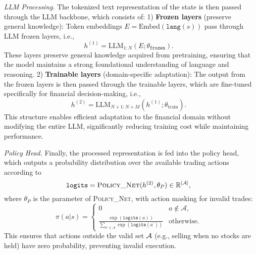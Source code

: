 \emph{LLM Processing.} The tokenized text representation of the state is then passed through the LLM backbone, which consists of:
1) \textbf{Frozen layers} (preserve general knowledge):
Token embeddings $E = \text{Embed}(\texttt{lang}(s))$ pass through LLM frozen layers, i.e.,
\begin{equation}
h^{(1)} = \text{LLM}_{1:N}(E;\theta_{\texttt{frozen}}).
\end{equation}
These layers preserve general knowledge acquired from pretraining, ensuring that the model maintains a strong foundational understanding of language and reasoning.
2) \textbf{Trainable layers} (domain-specific adaptation): The output from the frozen layers is then passed through the trainable layers, which are fine-tuned specifically for financial decision-making, i.e.,
\begin{equation}
h^{(2)} = \text{LLM}_{N+1:N+M}(h^{(1)};\theta_{\text{train}}).
\label{eq:trainable_layer}
\end{equation}
This structure enables efficient adaptation to the financial domain without modifying the entire LLM, significantly reducing training cost while maintaining performance.

\emph{Policy Head.} 
Finally, the processed representation is fed into the policy head, which outputs a probability distribution over the available trading actions according to
\begin{equation}
\texttt{logits} = \textsc{Policy\_Net}(h^{(2)},\theta_P)\in\mathbb{R}^{|\mathcal{A}|},
\label{eq:policy_dist}
\end{equation}
where $\theta_P$ is the parameter of \textsc{Policy\_Net},
with action masking for invalid trades: 
\begin{equation} 
\pi(a|s)\! =\!\! \begin{cases}
0 & a \notin \mathcal{A},\\
\frac{\exp(\texttt{logits}(a))}{\sum_{a'\in \mathcal{A}}\exp(\texttt{logits}(a^\prime))} & \text{otherwise}.
\end{cases}
\label{eq:masking}
\end{equation}
This ensures that actions outside the valid set 
$\mathcal{A}$ (e.g., selling when no stocks are held) have zero probability, preventing invalid execution.

